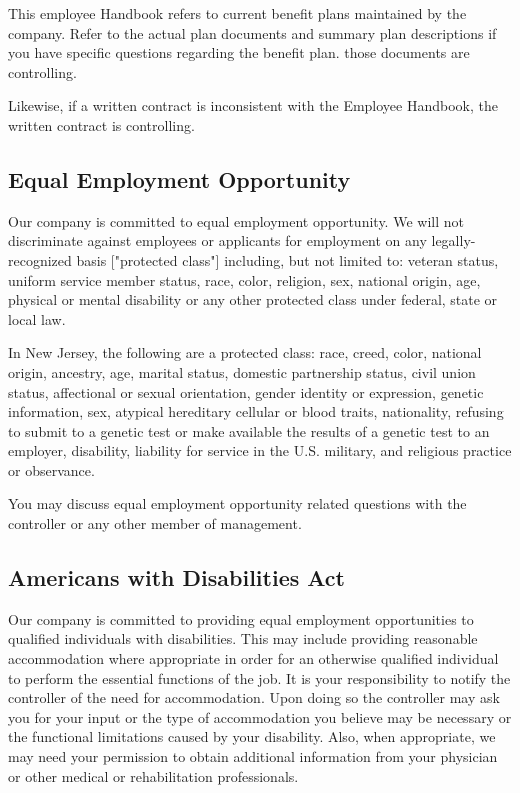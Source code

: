 This employee Handbook refers to current benefit plans maintained by the company. Refer to the actual plan documents and summary plan descriptions if you have specific questions regarding the benefit plan. those documents are controlling.

Likewise, if a written contract is inconsistent with the Employee Handbook, the written contract is controlling.

\subsection{Equal Employment Opportunity}

Our company is committed to equal employment opportunity. We will not discriminate against employees or applicants for employment on any legally-recognized basis ["protected class"] including, but not limited to: veteran status, uniform service member status, race, color, religion, sex, national origin, age, physical or mental disability or any other protected class under federal, state or local law.

In New Jersey, the following are a protected class: race, creed, color, national origin, ancestry, age, marital status, domestic partnership status, civil union status, affectional or sexual orientation, gender identity or expression, genetic information, sex, atypical hereditary cellular or blood traits, nationality, refusing to submit to a genetic test or make available the results of a genetic test to an employer, disability, liability for service in the U.S. military, and religious practice or observance.

You may discuss equal employment opportunity related questions with the controller or any other member of management.

\subsection{Americans with Disabilities Act}

Our company is committed to providing equal employment opportunities to qualified individuals with disabilities. This may include providing reasonable accommodation where appropriate in order for an otherwise qualified individual to perform the essential functions of the job. It is your responsibility to notify the controller of the need for accommodation. Upon doing so the controller may ask you for your input or the type of accommodation you believe may be necessary or the functional limitations caused by your disability. Also, when appropriate, we may need your permission to obtain additional information from your physician or other medical or rehabilitation professionals.

